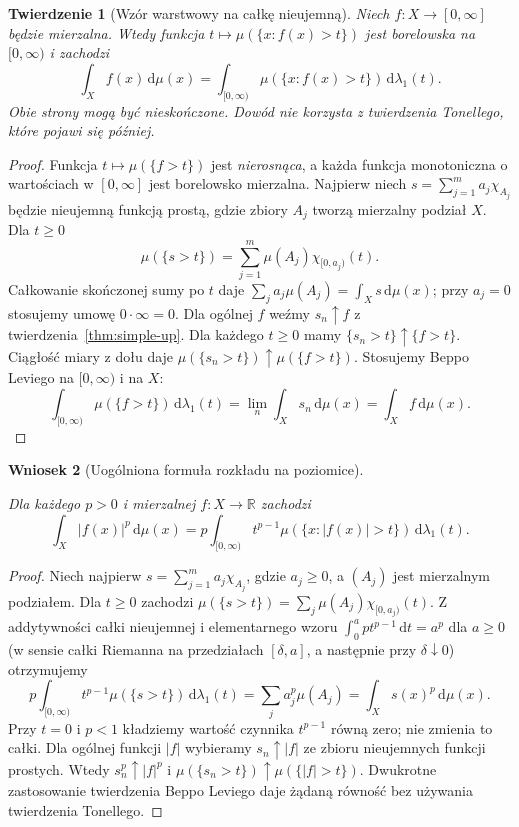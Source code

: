 \documentclass[11pt,a4paper,oneside]{book}
\numberwithin{equation}{chapter}
\theoremstyle{plain}
\newtheorem{twierdzenie}{Twierdzenie}[chapter]
\newtheorem{wniosek}[twierdzenie]{Wniosek}
\theoremstyle{definition}
\theoremstyle{remark}
\begin{document}
\begin{twierdzenie}[Wzór warstwowy na całkę nieujemną]
\label{thm:layer-cake-8}
Niech $f:X\to[0,\infty]$ będzie mierzalna.
Wtedy funkcja $t\mapsto\mu(\{x:f(x)>t\})$
jest borelowska na $[0,\infty)$ i zachodzi
\begin{equation}\label{eq:layer-cake-8}
\int_Xf(x)\,\mathrm d\mu(x)
=\int_{[0,\infty)}\mu(\{x:f(x)>t\})\,
\mathrm d\lambda_1(t).
\end{equation}
Obie strony mogą być nieskończone. Dowód nie korzysta
z twierdzenia Tonellego, które pojawi się później.
\end{twierdzenie}
\begin{proof}
Funkcja $t\mapsto\mu(\{f>t\})$ jest \emph{nierosnąca},
a każda funkcja monotoniczna
o wartościach w $[0,\infty]$ jest borelowsko mierzalna.
Najpierw niech $s=\sum_{j=1}^m a_j\chi_{A_j}$
będzie nieujemną funkcją prostą, gdzie zbiory $A_j$
tworzą mierzalny podział $X$. Dla $t\ge0$
\[
\mu(\{s>t\})=\sum_{j=1}^m
\mu(A_j)\chi_{[0,a_j)}(t).
\]
Całkowanie skończonej sumy po $t$ daje
$\sum_ja_j\mu(A_j)=\int_Xs\,\mathrm d\mu(x)$;
przy $a_j=0$ stosujemy umowę $0\cdot\infty=0$.
Dla ogólnej $f$ weźmy $s_n\uparrow f$ z
twierdzenia~\ref{thm:simple-up}. Dla każdego $t\ge0$
mamy $\{s_n>t\}\uparrow\{f>t\}$. Ciągłość miary
z dołu daje
$\mu(\{s_n>t\})\uparrow\mu(\{f>t\})$.
Stosujemy Beppo Leviego na $[0,\infty)$ i na $X$:
\[
\int_{[0,\infty)}\mu(\{f>t\})\,
\mathrm d\lambda_1(t)
=\lim_n\int_Xs_n\,\mathrm d\mu(x)
=\int_Xf\,\mathrm d\mu(x).
\]
\end{proof}

\begin{wniosek}[Uogólniona formuła rozkładu na poziomice]\label{idx:08:wniosek:20}

Dla każdego $p>0$ i mierzalnej $f:X\to\mathbb R$
zachodzi
\[
\int_X|f(x)|^p\,\mathrm d\mu(x)
=p\int_{[0,\infty)}t^{p-1}
\mu(\{x:|f(x)|>t\})\,\mathrm d\lambda_1(t).
\]
\end{wniosek}
\begin{proof}
Niech najpierw $s=\sum_{j=1}^m a_j\chi_{A_j}$,
gdzie $a_j\ge0$, a $(A_j)$ jest mierzalnym podziałem.
Dla $t\ge0$ zachodzi
$\mu(\{s>t\})=\sum_j\mu(A_j)\chi_{[0,a_j)}(t)$.
Z addytywności całki nieujemnej i elementarnego wzoru
$\int_0^{a}pt^{p-1}\,\mathrm dt=a^p$ dla $a\ge0$
(w sensie całki Riemanna na przedziałach
$[\delta,a]$, a następnie przy $\delta\downarrow0$)
otrzymujemy
\[
p\int_{[0,\infty)}t^{p-1}\mu(\{s>t\})\,
\mathrm d\lambda_1(t)=\sum_j a_j^p\mu(A_j)
=\int_Xs(x)^p\,\mathrm d\mu(x).
\]
Przy $t=0$ i $p<1$ kładziemy wartość czynnika
$t^{p-1}$ równą zero; nie zmienia to całki.
Dla ogólnej funkcji $|f|$ wybieramy $s_n\uparrow|f|$
ze zbioru nieujemnych funkcji prostych.
Wtedy $s_n^p\uparrow|f|^p$ i
$\mu(\{s_n>t\})\uparrow\mu(\{|f|>t\})$.
Dwukrotne zastosowanie twierdzenia Beppo Leviego
daje żądaną równość bez używania twierdzenia Tonellego.
\end{proof}
\end{document}
